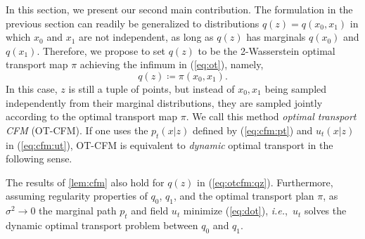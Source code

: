 \documentclass[10pt]{article}
\theoremstyle{plain}
\theoremstyle{definition}
\theoremstyle{remark}
\newcommand{\ie}{\textit{i.e.}}
\begin{document}
In this section, we present our second main contribution.
The formulation in the previous section can readily be generalized to distributions $q(z)=q(x_0,x_1)$ in which $x_0$ and $x_1$ are not independent, as long as $q(z)$ has marginals $q(x_0)$ and $q(x_1)$. Therefore, we propose to set $q(z)$ to be the 2-Wasserstein optimal transport map $\pi$ achieving the infimum in (\ref{eq:ot}), namely, %
\begin{equation}
q(z) \coloneqq \pi(x_0, x_1).\label{eq:otcfm:qz}
\end{equation}
%
In this case, $z$ is still a tuple of points, but instead of $x_0,x_1$ being sampled independently from their marginal distributions, they are sampled jointly according to the optimal transport map $\pi$. We call this method \emph{optimal transport CFM} (OT-CFM). If one uses the $p_t(x | z)$ defined by (\ref{eq:cfm:pt}) and $u_t(x | z)$ in (\ref{eq:cfm:ut}), OT-CFM is equivalent to \emph{dynamic} optimal transport in the following sense.
\begin{propositionE}\label{lem:otcfm}
The results of \autoref{lem:cfm} also hold for $q(z)$ in (\ref{eq:otcfm:qz}). Furthermore, assuming regularity properties of $q_0$, $q_1$, and the optimal transport plan $\pi$, as $\sigma^2 \to 0$ the marginal path $p_t$ and field $u_t$ minimize (\ref{eq:dot}), \ie,\ $u_t$ solves the dynamic optimal transport problem between $q_0$ and $q_1$.
\end{propositionE}
\end{document}
